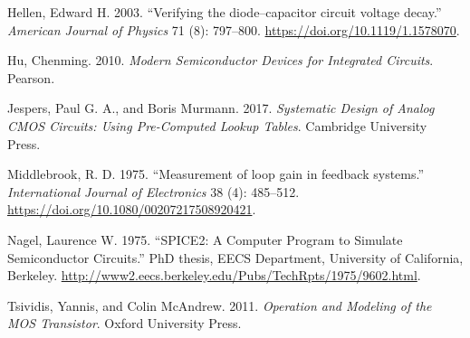 \documentclass[
  a4paper,
  DIV=11,
  numbers=noendperiod]{scrartcl}
\newlength{\cslhangindent}
\newenvironment{CSLReferences}[2] %
 {\begin{list}{}{%
  \setlength{\itemindent}{0pt}
  \setlength{\leftmargin}{0pt}
  \setlength{\parsep}{0pt}
  \ifodd #1
   \setlength{\leftmargin}{\cslhangindent}
   \setlength{\itemindent}{-1\cslhangindent}
  \fi
  \setlength{\itemsep}{#2\baselineskip}}}
 {\end{list}}
\begin{document}
\label{refs}
\begin{CSLReferences}{1}{0}
Hellen, Edward H. 2003. {``{Verifying the diode--capacitor circuit
voltage decay}.''} \emph{American Journal of Physics} 71 (8): 797--800.
\url{https://doi.org/10.1119/1.1578070}.

Hu, Chenming. 2010. \emph{Modern Semiconductor Devices for Integrated
Circuits}. Pearson.

Jespers, Paul G. A., and Boris Murmann. 2017. \emph{Systematic Design of
Analog CMOS Circuits: Using Pre-Computed Lookup Tables}. Cambridge
University Press.

Middlebrook, R. D. 1975. {``{Measurement of loop gain in feedback
systems}.''} \emph{International Journal of Electronics} 38 (4):
485--512. \url{https://doi.org/10.1080/00207217508920421}.

Nagel, Laurence W. 1975. {``SPICE2: A Computer Program to Simulate
Semiconductor Circuits.''} PhD thesis, EECS Department, University of
California, Berkeley.
\url{http://www2.eecs.berkeley.edu/Pubs/TechRpts/1975/9602.html}.

Tsividis, Yannis, and Colin McAndrew. 2011. \emph{Operation and Modeling
of the MOS Transistor}. Oxford University Press.

\end{CSLReferences}
\end{document}
